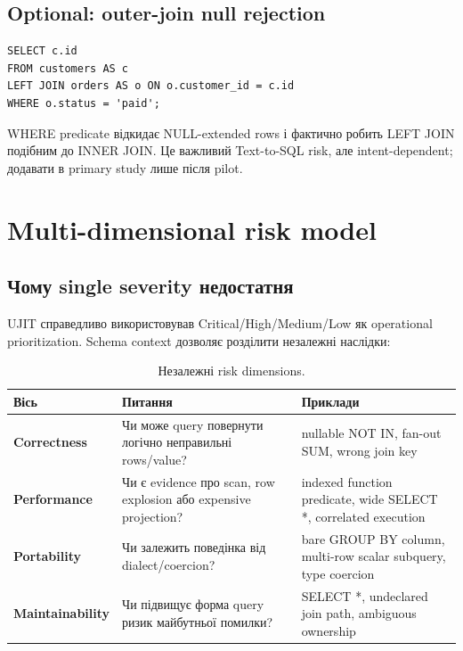 \documentclass[11pt,a4paper]{article}
\begin{document}
\subsection{Optional: outer-join null rejection}

\begin{lstlisting}[style=sqlstyle]
SELECT c.id
FROM customers AS c
LEFT JOIN orders AS o ON o.customer_id = c.id
WHERE o.status = 'paid';
\end{lstlisting}

WHERE predicate відкидає NULL-extended rows і фактично робить LEFT JOIN подібним до
INNER JOIN. Це важливий Text-to-SQL risk, але intent-dependent; додавати в primary
study лише після pilot.

\section{Multi-dimensional risk model}

\subsection{Чому single severity недостатня}

UJIT справедливо використовував Critical/High/Medium/Low як operational
prioritization. Schema context дозволяє розділити незалежні наслідки:

\begin{table}[h]
\centering
\small
\begin{tabularx}{\textwidth}{>{\bfseries}p{3cm}YY}
\toprule
Вісь & Питання & Приклади \\
\midrule
Correctness &
Чи може query повернути логічно неправильні rows/value? &
nullable NOT IN, fan-out SUM, wrong join key \\
Performance &
Чи є evidence про scan, row explosion або expensive projection? &
indexed function predicate, wide SELECT *, correlated execution \\
Portability &
Чи залежить поведінка від dialect/coercion? &
bare GROUP BY column, multi-row scalar subquery, type coercion \\
Maintainability &
Чи підвищує форма query ризик майбутньої помилки? &
SELECT *, undeclared join path, ambiguous ownership \\
\bottomrule
\end{tabularx}
\caption{Незалежні risk dimensions.}
\end{table}
\end{document}
